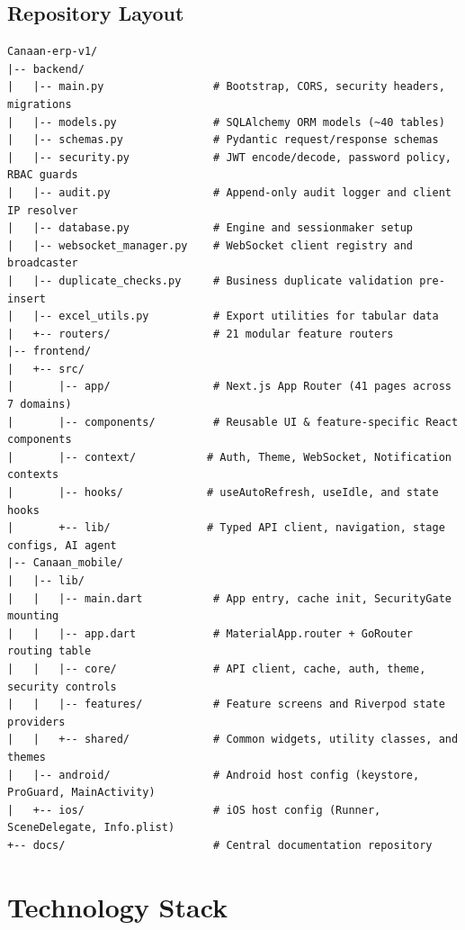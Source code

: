\documentclass[11pt,a4paper]{article}
\begin{document}
\subsection*{Repository Layout}
\begin{lstlisting}[style=asciiart]
Canaan-erp-v1/
|-- backend/
|   |-- main.py                 # Bootstrap, CORS, security headers, migrations
|   |-- models.py               # SQLAlchemy ORM models (~40 tables)
|   |-- schemas.py              # Pydantic request/response schemas
|   |-- security.py             # JWT encode/decode, password policy, RBAC guards
|   |-- audit.py                # Append-only audit logger and client IP resolver
|   |-- database.py             # Engine and sessionmaker setup
|   |-- websocket_manager.py    # WebSocket client registry and broadcaster
|   |-- duplicate_checks.py     # Business duplicate validation pre-insert
|   |-- excel_utils.py          # Export utilities for tabular data
|   +-- routers/                # 21 modular feature routers
|-- frontend/
|   +-- src/
|       |-- app/                # Next.js App Router (41 pages across 7 domains)
|       |-- components/         # Reusable UI & feature-specific React components
|       |-- context/           # Auth, Theme, WebSocket, Notification contexts
|       |-- hooks/             # useAutoRefresh, useIdle, and state hooks
|       +-- lib/               # Typed API client, navigation, stage configs, AI agent
|-- Canaan_mobile/
|   |-- lib/
|   |   |-- main.dart           # App entry, cache init, SecurityGate mounting
|   |   |-- app.dart            # MaterialApp.router + GoRouter routing table
|   |   |-- core/               # API client, cache, auth, theme, security controls
|   |   |-- features/           # Feature screens and Riverpod state providers
|   |   +-- shared/             # Common widgets, utility classes, and themes
|   |-- android/                # Android host config (keystore, ProGuard, MainActivity)
|   +-- ios/                    # iOS host config (Runner, SceneDelegate, Info.plist)
+-- docs/                       # Central documentation repository
\end{lstlisting}

\section{Technology Stack}
\end{document}
